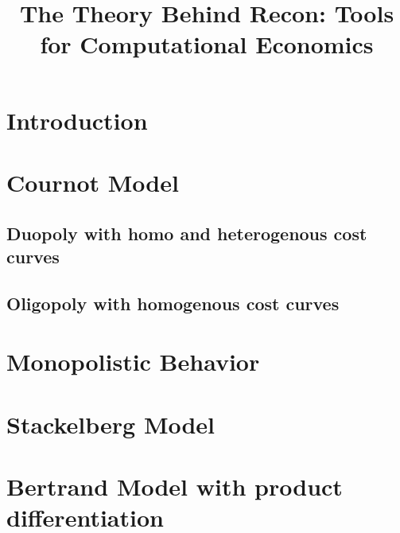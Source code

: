 \documentclass[11pt, a4paper]{article}
\title{The Theory Behind Recon: Tools for Computational Economics}
\author{Matheus Evangelsita\thanks{Departamento de Economia, Pontífice Universidade Católica do Rio de Janeiro (PUC-Rio)} \and Pedro Cavalcante Oliveira\thanks{Faculdade de Economia, Universidade Federal Fluminense (UFF) \and Marcelo Gelati \thanks{Instituto Nacional de Matemática Pura e Aplicada (IMPA) \and Diego S. Cardoso \thanks{Dyson School of Management and Applied Economics, Cornell University}}}}
\begin{document}
\maketitle

\section{Introduction}

\section{Cournot Model}
\subsection{Duopoly with homo and heterogenous cost curves}
\subsection{Oligopoly with homogenous cost curves}

\section{Monopolistic Behavior}

\section{Stackelberg Model}

\section{Bertrand Model with product differentiation}
\end{document}
